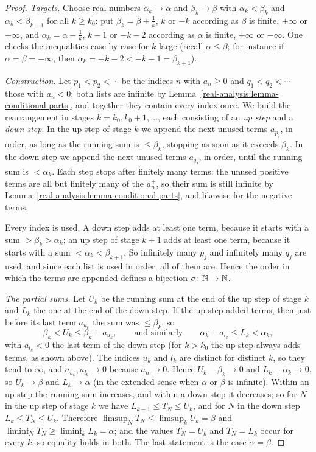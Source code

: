 \begin{proof}
\emph{Targets.} Choose real numbers $\alpha_k \to \alpha$ and $\beta_k \to \beta$ with $\alpha_k < \beta_k$ and $\alpha_k < \beta_{k+1}$ for all $k \geq k_0$: put $\beta_k = \beta + \frac1k$, $k$ or $-k$
according as $\beta$ is finite, $+\infty$ or $-\infty$, and $\alpha_k = \alpha - \frac1k$, $k - 1$ or $-k - 2$ according as $\alpha$ is finite, $+\infty$ or $-\infty$. One checks the inequalities case by
case for $k$ large (recall $\alpha \leq \beta$; for instance if $\alpha = \beta = -\infty$, then $\alpha_k = -k - 2 < -k - 1 = \beta_{k+1}$).

\emph{Construction.} Let $p_1 < p_2 < \cdots$ be the indices $n$ with $a_n \geq 0$ and $q_1 < q_2 < \cdots$ those with $a_n < 0$; both lists are infinite by
Lemma~\ref{real-analysis:lemma-conditional-parts}, and together they contain every index once. We build the rearrangement in stages $k = k_0, k_0 + 1, \ldots$, each consisting of an \emph{up step} and
a \emph{down step}. In the up step of stage $k$ we append the next unused terms $a_{p_j}$, in order, as long as the running sum is $\leq \beta_k$, stopping as soon as it exceeds $\beta_k$. In the down step
we append the next unused terms $a_{q_j}$, in order, until the running sum is $< \alpha_k$. Each step stops after finitely many terms: the unused positive terms are all but finitely many of the $a_n^+$,
so their sum is still infinite by Lemma~\ref{real-analysis:lemma-conditional-parts}, and likewise for the negative terms.

Every index is used. A down step adds at least one term, because it starts with a sum $> \beta_k > \alpha_k$; an up step of stage $k + 1$ adds at least one term, because it starts with a sum
$< \alpha_k < \beta_{k+1}$. So infinitely many $p_j$ and infinitely many $q_j$ are used, and since each list is used in order, all of them are. Hence the order in which the terms are appended defines a
bijection $\sigma \colon \mathbb{N} \to \mathbb{N}$.

\emph{The partial sums.} Let $U_k$ be the running sum at the end of the up step of stage $k$ and $L_k$ the one at the end of the down step. If the up step added terms, then just before its last term
$a_{u_k}$ the sum was $\leq \beta_k$, so
\[
\beta_k < U_k \leq \beta_k + a_{u_k}, \qquad\text{and similarly}\qquad \alpha_k + a_{l_k} \leq L_k < \alpha_k,
\]
with $a_{l_k} < 0$ the last term of the down step (for $k > k_0$ the up step always adds terms, as shown above). The indices $u_k$ and $l_k$ are distinct for distinct $k$, so they tend to $\infty$, and
$a_{u_k}, a_{l_k} \to 0$ because $a_n \to 0$. Hence $U_k - \beta_k \to 0$ and $L_k - \alpha_k \to 0$, so $U_k \to \beta$ and $L_k \to \alpha$ (in the extended sense when $\alpha$ or $\beta$ is
infinite). Within an up step the running sum increases, and within a down step it decreases; so for $N$ in the up step of stage $k$ we have $L_{k-1} \leq T_N \leq U_k$, and for $N$ in the down step
$L_k \leq T_N \leq U_k$. Therefore $\limsup_NT_N \leq \limsup_kU_k = \beta$ and $\liminf_NT_N \geq \liminf_kL_k = \alpha$; and the values $T_N = U_k$ and $T_N = L_k$ occur for every $k$, so
equality holds in both. The last statement is the case $\alpha = \beta$.
\end{proof}

